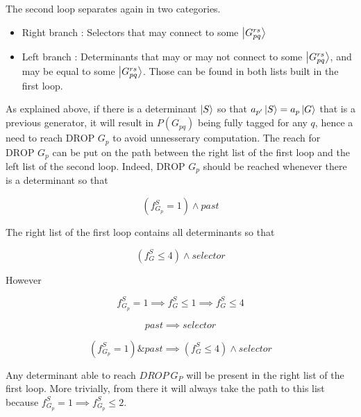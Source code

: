 \documentclass[./thesis.tex]{subfiles}
\begin{document}
The second loop separates again in two categories.

\begin{itemize}
\item
Right branch : Selectors that may connect to some $\ket {G_{pq}^{rs}}$
\item
Left branch : Determinants that may or may not connect to some $\ket {G_{pq}^{rs}}$, and may be equal to some $\ket {G_{pq}^{rs}}$. Those can be found in both lists built in the first loop.
\end{itemize}

As explained above, if there is a determinant $\ket S$ so that $a_{p'} \ket S = a_p \ket G$ that is a previous generator, it will result in $P(G_{pq})$ being fully tagged for any $q$, hence a need to reach $\text {DROP } G_p$ to avoid unnesserary computation.
The reach for $\text {DROP } G_p$ can be put on the path between the right list of the first loop and the left list of the second loop.
Indeed, $\text {DROP } G_p$ should be reached whenever there is a determinant so that


\begin{equation}
(f^S_{G_{p}} = 1) \wedge past
\end{equation}


The right list of the first loop contains all determinants so that


\begin{equation}
(f^S_G \leq 4) \wedge selector
\end{equation}


However 


\begin{equation}
f^S_{G_{p}} = 1 \implies f^S_G \leq 1 \implies f^S_G \leq 4
\end{equation}


\begin{equation}
past \implies selector
\end{equation}


\begin{equation}
(f^S_{G_{p}} = 1) \& past \implies (f^S_G \leq 4) \wedge selector
\end{equation}



Any determinant able to reach $DROP\ G_P$ will be present in the right list of the first loop. More trivially, from there it will always take the path to this list because $f^S_{G_{p}} = 1 \implies f^S_{G_{p}} \leq 2$.
\end{document}
